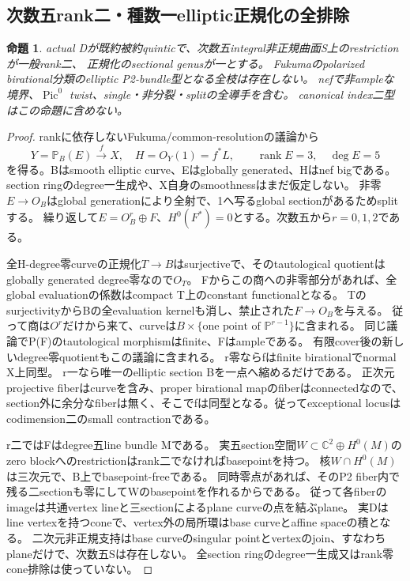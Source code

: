 \documentclass[a4paper,11pt]{ltjsarticle}
\newtheorem{proposition}{命題}[section]
\theoremstyle{definition}
\newcommand{\rank}{\operatorname{rank}}
\begin{document}
\subsection{次数五rank二・種数一elliptic正規化の全排除}
\begin{proposition}\label{prop:ranktwo-quintic-genusone-elliptic-empty}
actual Dが既約被約quinticで、次数五integral非正規曲面S上のrestrictionが一般rank二、
正規化のsectional genusが一とする。
Fukumaのpolarized birational分類のelliptic P2-bundle型となる全枝は存在しない。
nefで非ampleな境界、$\operatorname{Pic}^0$ twist、single・非分裂・splitの全導手を含む。
canonical index二型はこの命題に含めない。
\end{proposition}
\begin{proof}
rankに依存しないFukuma/common-resolutionの議論から
\[
 Y=\mathbb P_B(E)\xrightarrow{f}X,\quad H=O_Y(1)=f^*L,
 \qquad\rank E=3,\quad\deg E=5
\]
を得る。Bはsmooth elliptic curve、Eはglobally generated、Hはnef bigである。
section ringのdegree一生成や、X自身のsmoothnessはまだ仮定しない。
非零$E\to O_B$はglobal generationにより全射で、1へ写るglobal sectionがあるためsplitする。
繰り返して$E=O_B^r\oplus F$、$H^0(F^*)=0$とする。次数五から$r=0,1,2$である。

全H-degree零curveの正規化$T\to B$はsurjectiveで、そのtautological quotientはglobally generated degree零なので$O_T$。
Fからこの商への非零部分があれば、全global evaluationの係数はcompact T上のconstant functionalとなる。
TのsurjectivityからBの全evaluation kernelも消し、禁止された$F\to O_B$を与える。
従って商は$O^r$だけから来て、curveは$B\times\{\text{one point of }\mathbb P^{r-1}\}$に含まれる。
同じ議論でP(F)のtautological morphismはfinite、Fはampleである。
有限cover後の新しいdegree零quotientもこの議論に含まれる。
r零ならfはfinite birationalでnormal X上同型。
r一なら唯一のelliptic section Bを一点へ縮めるだけである。
正次元projective fiberはcurveを含み、proper birational mapのfiberはconnectedなので、
section外に余分なfiberは無く、そこでfは同型となる。従ってexceptional locusはcodimension二のsmall contractionである。

r二ではFはdegree五line bundle Mである。
実五section空間$W\subset\mathbb C^2\oplus H^0(M)$のzero blockへのrestrictionはrank二でなければbasepointを持つ。
核$W\cap H^0(M)$は三次元で、B上でbasepoint-freeである。
同時零点があれば、そのP2 fiber内で残る二sectionも零にしてWのbasepointを作れるからである。
従って各fiberのimageは共通vertex lineと三sectionによるplane curveの点を結ぶplane。
実Dはline vertexを持つconeで、vertex外の局所環はbase curveとaffine spaceの積となる。
二次元非正規支持はbase curveのsingular pointとvertexのjoin、すなわちplaneだけで、次数五Sは存在しない。
全section ringのdegree一生成又はrank零cone排除は使っていない。


\end{proof}
\end{document}
